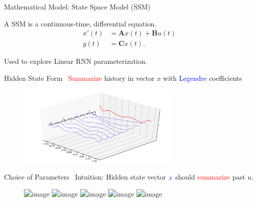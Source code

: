 \begin{frame}{Mathematical Model: State Space Model (SSM) }

A SSM is a continuous-time, differential equation.
\begin{align*}
    x'(t) &= \boldsymbol{A}x(t) + \boldsymbol{B}u(t) \\  
    y(t) &= \boldsymbol{C}x(t).
\end{align*}

Used to explore Linear RNN parameterization.
\end{frame}

\begin{frame}{Hidden State Form~\cite{gu2020hippo}}
  \textcolor{red}{Summarize} history in vector $x$ with \textcolor{blue}{Legendre} coefficients 
    \begin{figure}
    \centering
    \includegraphics[width=0.7\textwidth]{Figs/hippo.png}
    \end{figure}
\end{frame}

\begin{frame}{Choice of Parameters~\cite{gu2020hippo}}
    Intuition: Hidden state vector $\textcolor{blue}{x}$ should \textcolor{red}{summarize} past $u$. 

\begin{figure}
    \centering
    \includegraphics<1>[width=\textwidth]{Figs/frame_10_delay-0.1s.png}
    \includegraphics<2>[width=\textwidth]{Figs/frame_20_delay-0.1s.png}
    \includegraphics<3>[width=\textwidth]{Figs/frame_30_delay-0.1s.png}
    \includegraphics<4>[width=1\textwidth]{Figs/frame_40_delay-0.1s.png}
    \includegraphics<5>[width=1\textwidth]{Figs/frame_50_delay-0.1s.png}
\end{figure}

\end{frame}



    

